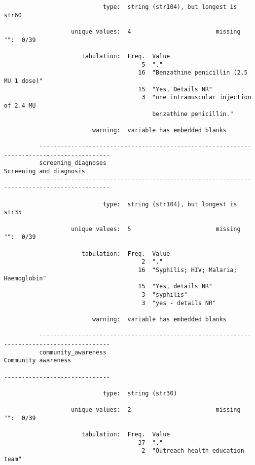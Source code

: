 \documentclass{article}
\begin{document}
\begin{verbatim}
                            type:  string (str104), but longest is str60
          
                   unique values:  4                        missing "":  0/39
          
                      tabulation:  Freq.  Value
                                       5  "."
                                      16  "Benzathine penicillin (2.5 MU 1 dose)"
                                      15  "Yes, Details NR"
                                       3  "one intramuscular injection of 2.4 MU
                                          benzathine penicillin."
          
                         warning:  variable has embedded blanks
          
          ------------------------------------------------------------------------------------------
          screening_diagnoses                                                Screening and diagnosis
          ------------------------------------------------------------------------------------------
          
                            type:  string (str104), but longest is str35
          
                   unique values:  5                        missing "":  0/39
          
                      tabulation:  Freq.  Value
                                       2  "."
                                      16  "Syphilis; HIV; Malaria; Haemoglobin"
                                      15  "Yes, details NR"
                                       3  "syphilis"
                                       3  "yes - details NR"
          
                         warning:  variable has embedded blanks
          
          ------------------------------------------------------------------------------------------
          community_awareness                                                    Community awareness
          ------------------------------------------------------------------------------------------
          
                            type:  string (str30)
          
                   unique values:  2                        missing "":  0/39
          
                      tabulation:  Freq.  Value
                                      37  "."
                                       2  "Outreach health education team"
          

\end{verbatim}
\end{document}

